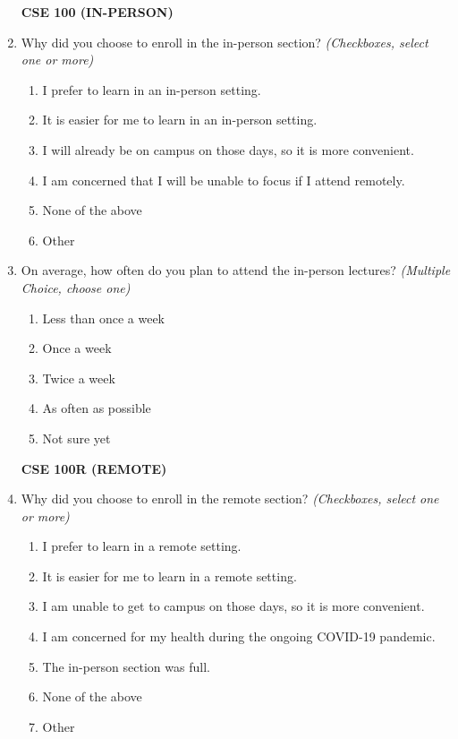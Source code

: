 \begin{enumerate}
\noindent \textbf{CSE 100 (IN-PERSON)}

    \item Why did you choose to enroll in the in-person section? \textit{(Checkboxes, select one or more)}
    \begin{enumerate}
        \item I prefer to learn in an in-person setting.
        \item It is easier for me to learn in an in-person setting.
        \item I will already be on campus on those days, so it is more convenient.
        \item I am concerned that I will be unable to focus if I attend remotely.
        \item None of the above
        \item Other
    \end{enumerate}

    \item On average, how often do you plan to attend the in-person lectures? \textit{(Multiple Choice, choose one)}
    \begin{enumerate}
        \item Less than once a week
        \item Once a week
        \item Twice a week
        \item As often as possible
        \item Not sure yet
    \end{enumerate}

\noindent \textbf{CSE 100R (REMOTE)}

    \item Why did you choose to enroll in the remote section? \textit{(Checkboxes, select one or more)}
    \begin{enumerate}
        \item I prefer to learn in a remote setting.
        \item It is easier for me to learn in a remote setting.
        \item I am unable to get to campus on those days, so it is more convenient.
        \item I am concerned for my health during the ongoing COVID-19 pandemic.
        \item The in-person section was full.
        \item None of the above
        \item Other
    \end{enumerate}


\end{enumerate}
